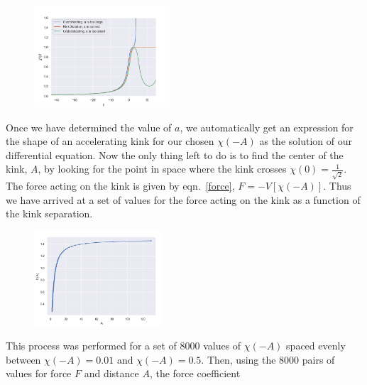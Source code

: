 \documentclass[11pt, oneside]{article}  	%
\numberwithin{equation}{section}
\begin{document}
\begin{figure}[t]
\vspace{-10pt}
\centering
\includegraphics[width=0.45\textwidth]{over_under.png}
 \label{over_under}
\vspace{-10pt}
\end{figure} 
Once we have determined the value of $a$, we automatically get an expression for the shape of an accelerating kink for our chosen $\chi(-A)$ as the solution of our differential equation. Now the only thing left to do is to find the center of the kink, $A$, by looking for the point in space where the kink crosses $\chi(0) = \frac{1}{\sqrt{2}}$. The force acting on the kink is given by eqn.~\ref{force}, $F = -V[\chi(-A)]$. Thus we have arrived at a set of values for the force acting on the kink as a function of the kink separation.\par
\begin{figure}[t]
    \vspace{-10pt}
    \centering
    \includegraphics[width=0.42\textwidth]{coefficient_scatter_kak.png}
     \label{coefficient_scatter}
    \vspace{+10pt}
\end{figure}
This process was performed for a set of 8000 values of $\chi(-A)$ spaced evenly between $\chi(-A) = 0.01$ and $\chi(-A) = 0.5$. Then, using the 8000 pairs of values for force $F$ and distance $A$, the force coefficient
\end{document}
